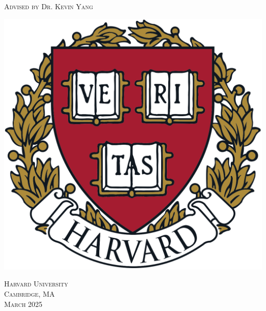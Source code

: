 \documentclass[11pt]{article}
\newcommand\blankpage{%
    \null
    \thispagestyle{empty}%
    \addtocounter{page}{-1}%
    \newpage}
\begin{document}
\begin{titlepage}
\begin{center}
        \vspace{0.5cm}
                \begin{center}
    \Large{\textsc{Advised by Dr. Kevin Yang}}
    \end{center}
    \vspace{0.5cm}
        \includegraphics[scale=1.25]{harvard_logo.png}
        
        \Large{\textsc{Harvard University\\ \vspace{-0.5cm}
        Cambridge, MA\\ \vspace{-0.5cm}
        March 2025}}
        
    \end{center}
    \afterpage{\blankpage}
\end{titlepage}

\end{document}
